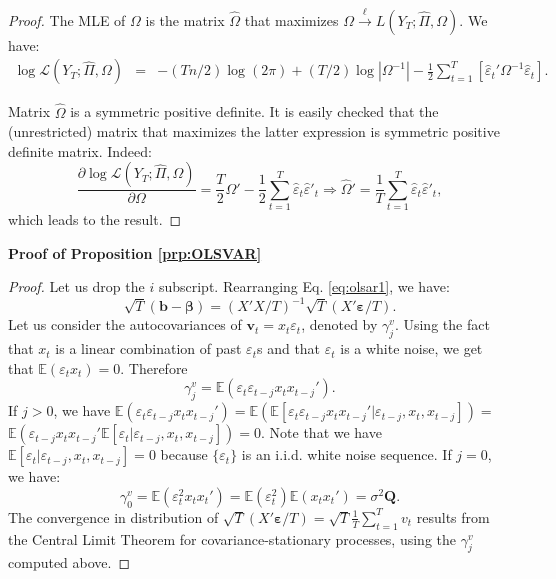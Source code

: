 \documentclass[
  12pt,
]{book}
\theoremstyle{definition}
\theoremstyle{definition}
\theoremstyle{definition}
\theoremstyle{definition}
\theoremstyle{remark}
\begin{document}
\begin{proof}
The MLE of \(\Omega\) is the matrix \(\hat{\Omega}\) that maximizes \(\Omega\overset{\ell}{\rightarrow}L(Y_{T};\hat{\Pi},\Omega)\). We have:
\begin{eqnarray*}
\log\mathcal{L}(Y_{T};\hat{\Pi},\Omega) & = & -(Tn/2)\log(2\pi)+(T/2)\log\left|\Omega^{-1}\right| -\frac{1}{2}\sum_{t=1}^{T}\left[\hat{\varepsilon}_{t}'\Omega^{-1}\hat{\varepsilon}_{t}\right].
\end{eqnarray*}

Matrix \(\hat{\Omega}\) is a symmetric positive definite. It is easily checked that the (unrestricted) matrix that maximizes the latter expression is symmetric positive definite matrix. Indeed:
\[
\frac{\partial \log\mathcal{L}(Y_{T};\hat{\Pi},\Omega)}{\partial\Omega}=\frac{T}{2}\Omega'-\frac{1}{2}\sum_{t=1}^{T}\hat{\varepsilon}_{t}\hat{\varepsilon}'_{t}\Rightarrow\hat{\Omega}'=\frac{1}{T}\sum_{t=1}^{T}\hat{\varepsilon}_{t}\hat{\varepsilon}'_{t},
\]
which leads to the result.
\end{proof}

\textbf{Proof of Proposition \ref{prp:OLSVAR}}

\begin{proof}
Let us drop the \(i\) subscript. Rearranging Eq. \eqref{eq:olsar1}, we have:
\[
\sqrt{T}(\mathbf{b}-\boldsymbol{\beta}) =  (X'X/T)^{-1}\sqrt{T}(X'\boldsymbol\varepsilon/T).
\]
Let us consider the autocovariances of \(\mathbf{v}_t = x_t \varepsilon_t\), denoted by \(\gamma^v_j\). Using the fact that \(x_t\) is a linear combination of past \(\varepsilon_t\)s and that \(\varepsilon_t\) is a white noise, we get that \(\mathbb{E}(\varepsilon_t x_t)=0\). Therefore
\[
\gamma^v_j = \mathbb{E}(\varepsilon_t\varepsilon_{t-j}x_tx_{t-j}').
\]
If \(j>0\), we have \(\mathbb{E}(\varepsilon_t\varepsilon_{t-j}x_tx_{t-j}')=\mathbb{E}(\mathbb{E}[\varepsilon_t\varepsilon_{t-j}x_tx_{t-j}'|\varepsilon_{t-j},x_t,x_{t-j}])=\) \(\mathbb{E}(\varepsilon_{t-j}x_tx_{t-j}'\mathbb{E}[\varepsilon_t|\varepsilon_{t-j},x_t,x_{t-j}])=0\). Note that we have \(\mathbb{E}[\varepsilon_t|\varepsilon_{t-j},x_t,x_{t-j}]=0\) because \(\{\varepsilon_t\}\) is an i.i.d. white noise sequence. If \(j=0\), we have:
\[
\gamma^v_0 = \mathbb{E}(\varepsilon_t^2x_tx_{t}')= \mathbb{E}(\varepsilon_t^2) \mathbb{E}(x_tx_{t}')=\sigma^2\mathbf{Q}.
\]
The convergence in distribution of \(\sqrt{T}(X'\boldsymbol\varepsilon/T)=\sqrt{T}\frac{1}{T}\sum_{t=1}^Tv_t\) results from the Central Limit Theorem for covariance-stationary processes, using the \(\gamma_j^v\) computed above.
\end{proof}
\end{document}
